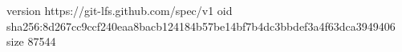 version https://git-lfs.github.com/spec/v1
oid sha256:8d267cc9ccf240eaa8bacb124184b57be14bf7b4dc3bbdef3a4f63dca3949406
size 87544
